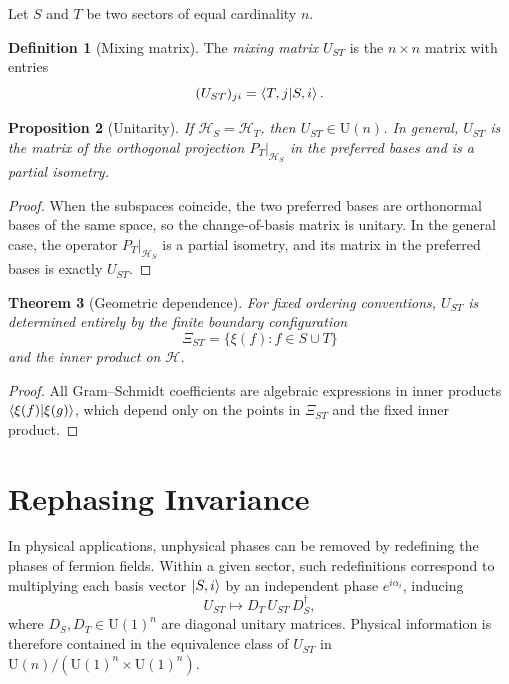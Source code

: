 \documentclass[12pt]{article}
\newtheorem{theorem}{Theorem}[section]
\newtheorem{proposition}[theorem]{Proposition}
\theoremstyle{definition}
\newtheorem{definition}[theorem]{Definition}
\theoremstyle{remark}
\newcommand{\U}{\mathrm{U}}
\newcommand{\calH}{\mathcal{H}}
\newcommand{\calHS}{\mathcal{H}_S}
\newcommand{\calHT}{\mathcal{H}_T}
\begin{document}
Let $S$ and $T$ be two sectors of equal cardinality $n$.

\begin{definition}[Mixing matrix]\label{def:mixing}
The \emph{mixing matrix} $U_{ST}$ is the $n\times n$ matrix with entries
\[
  (U_{ST})_{ji} = \braket{T,j|S,i}.
\]
\end{definition}

\begin{proposition}[Unitarity]\label{prop:unitary}
If $\calHS=\calHT$, then $U_{ST}\in\U(n)$.
In general, $U_{ST}$ is the matrix of the orthogonal projection
$P_T|_{\calHS}$ in the preferred bases and is a partial isometry.
\end{proposition}

\begin{proof}
When the subspaces coincide, the two preferred bases are orthonormal bases
of the same space, so the change-of-basis matrix is unitary.  In the
general case, the operator $P_T|_{\calHS}$ is a partial isometry, and its
matrix in the preferred bases is exactly $U_{ST}$.
\end{proof}

\begin{theorem}[Geometric dependence]\label{thm:geom}
For fixed ordering conventions, $U_{ST}$ is determined entirely by the
finite boundary configuration
\[
  \Xi_{ST} = \{\xi(f):f\in S\cup T\}
\]
and the inner product on $\calH$.
\end{theorem}

\begin{proof}
All Gram--Schmidt coefficients are algebraic expressions in inner products
$\braket{\xi(f)|\xi(g)}$, which depend only on the points in $\Xi_{ST}$
and the fixed inner product.
\end{proof}

\section{Rephasing Invariance}
\label{sec:rephasing}

In physical applications, unphysical phases can be removed by redefining
the phases of fermion fields.  Within a given sector, such redefinitions
correspond to multiplying each basis vector $\ket{S,i}$ by an independent
phase $e^{i\alpha_i}$, inducing
\[
  U_{ST} \mapsto D_T\,U_{ST}\,D_S^\dagger,
\]
where $D_S,D_T\in\U(1)^n$ are diagonal unitary matrices.
Physical information is therefore contained in the equivalence class of
$U_{ST}$ in $\U(n)/(\U(1)^n\times\U(1)^n)$.
\end{document}
